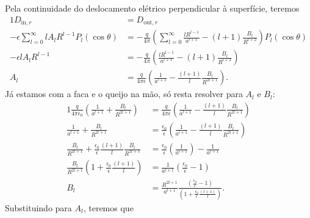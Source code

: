 \documentclass{article}
\begin{document}
Pela continuidade do deslocamento elétrico perpendicular à superfície, teremos
\begin{alignat}{1}
 D_{\mathrm{in},r} &= D_{\mathrm{out},r}\\
 - \epsilon \sum_{l = 0}^{\infty} l A_l R^{l-1} P_l (\cos{\theta}) &=
 -\frac{q}{4 \pi} \left( \sum_{l = 0}^{\infty} \frac{lR^{l-1}}{a^{l+1}} -(l+1) \frac{B_l}{R^{l+2}} \right) P_l (\cos{\theta}) \\
 - \epsilon l A_l R^{l-1} &= -\frac{q}{4 \pi} \left( \frac{lR^{l-1}}{a^{l+1}} -(l+1) \frac{B_l}{R^{l+2}} \right) \\
 A_l &= \frac{q}{4 \pi \epsilon} \left( \frac{1}{a^{l+1}} - \frac{(l+1)}{l} \frac{B_l}{R^{2l+1}} \right)\mathrm{.}
\end{alignat}
Já estamos com a faca e o queijo na mão, só resta resolver para $A_l$ e $B_l$:
\begin{alignat}{1}
 \frac{q}{4 \pi \epsilon_0} \left( \frac{1}{a^{l+1}} + \frac{B_l}{R^{2l+1}} \right) &=
 \frac{q}{4 \pi \epsilon} \left( \frac{1}{a^{l+1}} - \frac{(l+1)}{l} \frac{B_l}{R^{2l+1}} \right)\\
 \frac{1}{a^{l+1}} + \frac{B_l}{R^{2l+1}} &=
 \frac{\epsilon_0}{\epsilon} \left( \frac{1}{a^{l+1}} - \frac{(l+1)}{l} \frac{B_l}{R^{2l+1}} \right)\\
 \frac{B_l}{R^{2l+1}} + \frac{\epsilon_0}{\epsilon}\frac{(l+1)}{l} \frac{B_l}{R^{2l+1}}&=
 \frac{\epsilon_0}{\epsilon} \left( \frac{1}{a^{l+1}} \right) - \frac{1}{a^{l+1}}\\
 \frac{B_l}{R^{2l+1}} \left( 1 + \frac{\epsilon_0}{\epsilon}\frac{(l+1)}{l} \right) &=
 \frac{1}{a^{l+1}}\left(\frac{\epsilon_0}{\epsilon} - 1\right)\\
 B_l &= \frac{R^{2l+1}}{a^{l+1}}\frac{\left(\frac{\epsilon_0}{\epsilon} - 1\right)}{\left( 1 + \frac{\epsilon_0}{\epsilon}\frac{(l+1)}{l} \right)}\mathrm{.}
\end{alignat}
Substituindo para $A_l$, teremos que
\end{document}
